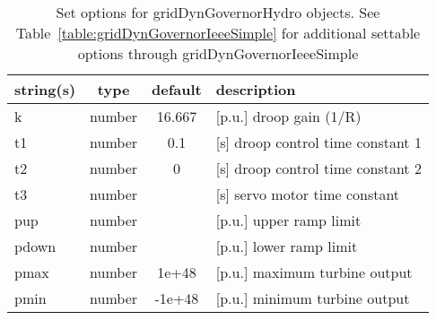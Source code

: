 \begin{table}[ht]
\centering
\begin{tabular}{p{5cm} c c p{7cm}}
\hline
string(s) & type & default & description \\
\hline
k & number & 16.667 & [p.u.] droop gain (1/R)\\
t1 & number & 0.1 & [s]   droop control time constant 1\\
t2 & number & 0 & [s]   droop control  time constant 2\\
t3 & number &  & [s]    servo motor time constant\\
pup & number &  & [p.u.] upper ramp limit\\
pdown & number &  & [p.u.] lower ramp limit\\
pmax & number & 1e+48 & [p.u.] maximum turbine output\\
pmin & number & -1e+48 & [p.u.] minimum turbine output\\
\hline
\end{tabular}
\caption{Set options for gridDynGovernorHydro objects. See Table~\ref{table:gridDynGovernorIeeeSimple} for additional settable options through gridDynGovernorIeeeSimple}
\label{table:gridDynGovernorHydro}
\end{table}
